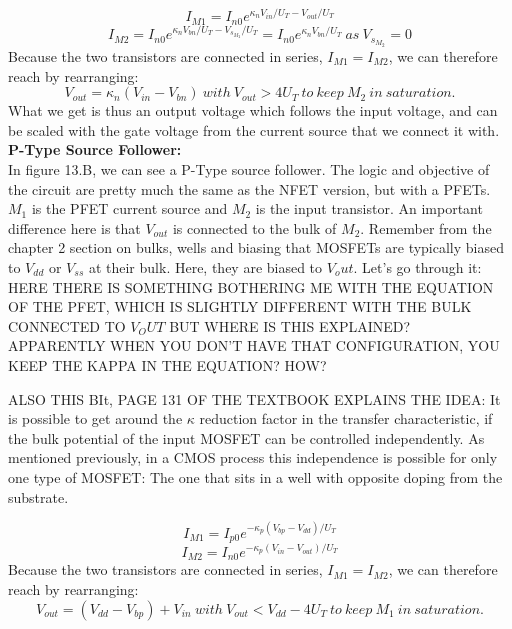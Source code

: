 \begin{equation}
I_{M1} = I_{n0}e^{\kappa_n V_{in}/U_T - V_{out}/U_T}
\end{equation}
\begin{equation}
I_{M2} = I_{n0}e^{\kappa_n V_{bn}/U_T - V_{s_{M_2}}/U_T} = I_{n0}e^{\kappa_n V_{bn}/U_T} \ as \ V_{s_{M_2}} = 0
\end{equation}
Because the two transistors are connected in series, $I_{M1} = I_{M2}$, we can therefore reach by rearranging:
\begin{equation}
V_{out} = \kappa_n(V_{in} - V_{bn}) \ with \ V_{out} > 4U_T \ to \ keep \ M_2 \ in \ saturation.
\end{equation}
What we get is thus an output voltage which follows the input voltage, and can be scaled with the gate voltage from the current source that we connect it with.
\newline \newline
\textbf{P-Type Source Follower:} \
\\
In figure 13.B, we can see a P-Type source follower. The logic and objective of the circuit are pretty much the same as the NFET version, but with a PFETs.  $M_{1}$ is the PFET current source and $M_{2}$ is the input transistor. An important difference here is that $V_{out}$ is connected to the bulk of $M_2$. Remember from the chapter 2 section on bulks, wells and biasing that MOSFETs are typically biased to $V_{dd}$ or $V_{ss}$ at their bulk. Here, they are biased to $V_out$.  Let's go through it: HERE THERE IS SOMETHING BOTHERING ME WITH THE EQUATION OF THE PFET, WHICH IS SLIGHTLY DIFFERENT WITH THE BULK CONNECTED TO $V_OUT$ BUT WHERE IS THIS EXPLAINED? APPARENTLY WHEN YOU DON'T HAVE THAT CONFIGURATION, YOU KEEP THE KAPPA IN THE EQUATION? HOW? 

ALSO THIS BIt, PAGE 131 OF THE TEXTBOOK EXPLAINS THE IDEA: 
It is possible to get around the $\kappa$ reduction factor in the transfer characteristic, if the bulk potential of the input MOSFET can be controlled independently. As mentioned previously, in a CMOS process this independence is possible for only one type of MOSFET: The one that sits in a well with opposite doping from the substrate.

\begin{equation}
I_{M1} = I_{p0}e^{-\kappa_p(V_{bp} - V_{dd})/U_T}
\end{equation}
\begin{equation}
I_{M2} = I_{n0}e^{-\kappa_p(V_{in} - V_{out})/U_T}
\end{equation}
Because the two transistors are connected in series, $I_{M1} = I_{M2}$, we can therefore reach by rearranging:
\begin{equation}
V_{out} = (V_{dd} - V_{bp}) + V_{in} \ with \ V_{out} < V_{dd} - 4U_T \ to \ keep \ M_1 \ in \ saturation.
\end{equation}

